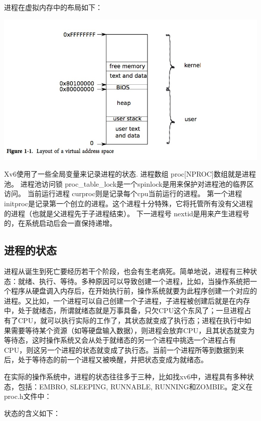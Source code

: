 进程在虚拟内存中的布局如下：

\includegraphics[width=6in]{figures/process/fig7.png}

Xv6使用了一些全局变量来记录进程的状态.
进程数组 proc[NPROC]数组就是进程池。
进程池访问锁 proc\_table\_lock是一个spinlock是用来保护对进程池的临界区访问。
当前运行进程 curproc则是记录每个cpu当前运行的进程。
第一个进程 initproc是记录第一个创立的进程。这个进程十分特殊，它将托管所有没有父进程的进程（也就是父进程先于子进程结束）。
下一进程号 nextid是用来产生进程号的，在系统启动后会一直保持递增。

\subsection{进程的状态}

进程从诞生到死亡要经历若干个阶段，也会有生老病死。简单地说，进程有三种状态：就绪、执行、等待。多种原因可以导致创建一个进程，比如，当操作系统把一个程序从硬盘调入内存后，在开始执行前，操作系统就要为此程序创建一个对应的进程。又比如，一个进程可以自己创建一个子进程，子进程被创建后就是在内存中，处于就绪态，所谓就绪态就是万事具备，只欠CPU这个东风了；一旦进程占有了CPU，就可以执行实际的工作了，其状态就变成了执行态；进程在执行中如果需要等待某个资源（如等硬盘输入数据），则进程会放弃CPU，且其状态就变为等待态，这时操作系统又会从处于就绪态的另一个进程中挑选一个进程占有CPU，则这另一个进程的状态就变成了执行态。当前一个进程所等到数据到来后，处于等待态的前一个进程又被唤醒，并把状态变成为就绪态。

在实际的操作系统中，进程的状态往往多于三种，比如找xv6中，进程具有多种状态，包括：EMBRO, SLEEPING, RUNNABLE, RUNNING和ZOMBIE。定义在proc.h文件中：


状态的含义如下：

